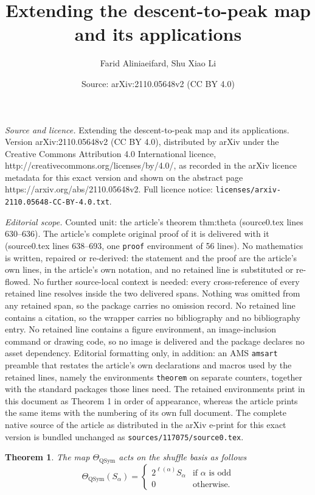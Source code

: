 \documentclass[10pt,a4paper]{amsart}
\title{Extending the descent-to-peak map and its applications}
\author{Farid Aliniaeifard, Shu Xiao Li}
\date{Source: arXiv:2110.05648v2 (CC BY 4.0)}
\newtheorem{theorem}{Theorem}
\newcommand{\QSym}{\mathrm{QSym}}
\begin{document}
\maketitle

\noindent\emph{Source and licence.} Extending the descent-to-peak map and its applications. Version arXiv:2110.05648v2 (CC BY 4.0), distributed by arXiv under the Creative Commons Attribution 4.0 International licence, http://creativecommons.org/licenses/by/4.0/, as recorded in the arXiv licence metadata for this exact version and shown on the abstract page https://arxiv.org/abs/2110.05648v2. Full licence notice: \texttt{licenses/arxiv-2110.05648-CC-BY-4.0.txt}.\par\smallskip

\noindent\textit{Editorial scope.} Counted unit: the article's theorem thm:theta (source0.tex lines 630--636). The article's complete original proof of it is delivered with it (source0.tex lines 638--693, one \texttt{proof} environment of 56 lines). No mathematics is written, repaired or re-derived: the statement and the proof are the article's own lines, in the article's own notation, and no retained line is substituted or re-flowed.  No further source-local context is needed: every cross-reference of every retained line resolves inside the two delivered spans.  Nothing was omitted from any retained span, so the package carries no omission record.  No retained line contains a citation, so the wrapper carries no bibliography and no bibliography entry.  No retained line contains a figure environment, an image-inclusion command or drawing code, so no image is delivered and the package declares no asset dependency.  Editorial formatting only, in addition: an AMS \texttt{amsart} preamble that restates the article's own declarations and macros used by the retained lines, namely the environments \texttt{theorem} on separate counters, together with the standard packages those lines need.  The retained environments print in this document as Theorem 1 in order of appearance, whereas the article prints the same items with the numbering of its own full document.  The complete native source of the article as distributed in the arXiv e-print for this exact version is bundled unchanged as \texttt{sources/117075/source0.tex}.
\begin{theorem}\label{thm:theta}
	The map $\Theta_\QSym$ acts on the shuffle basis as follows
	$$\Theta_\QSym(S_\alpha)=\left\{\begin{array}{cc}
		2^{\ell(\alpha)}S_\alpha & \text{if }\alpha \text{ is odd}\\
		0& \text{otherwise.}
		\end{array}\right.$$
\end{theorem}
\end{document}
